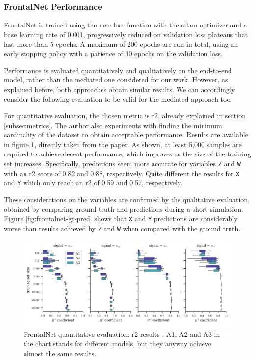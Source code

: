 \subsubsection{FrontalNet Performance}
\label{subsec:frontalnet-performance}


FrontalNet is trained using the \gls{mae} loss function with the \gls{adam} optimizer \cite{kingma2014adam} and a base learning rate of 0.001, progressively reduced on validation loss plateaus that last more than 5 epochs. A maximum of 200 epochs are run in total, using an early stopping policy with a patience of 10 epochs on the validation loss. 

Performance is evaluated quantitatively and qualitatively on the end-to-end model, rather than the mediated one considered for our work. However, as explained before, both approaches obtain similar results. We can accordingly consider the following evaluation to be valid for the mediated approach too.

\medskip 
For quantitative evaluation, the chosen metric is \gls{r2}, already explained in section \ref{subsec:metrics}. The author also experiments with finding the minimum cardinality of the dataset to obtain acceptable performance. Results are available in figure \ref{fig:frontalnet-r2}, directly taken from the paper. As shown, at least 5,000 samples are required to achieve decent performance, which improves as the size of the training set increases. Specifically, predictions seem more accurate for variables \texttt{Z} and \texttt{W} with an \gls{r2} score of 0.82 and 0.88, respectively. Quite different the results for \texttt{X} and \texttt{Y} which only reach an \gls{r2} of 0.59 and 0.57, respectively.

These considerations on the variables are confirmed by the qualitative evaluation, obtained by comparing ground truth and predictions during a short simulation. Figure \ref{fig:frontalnet-gt-pred} shows that \texttt{X} and \texttt{Y} predictions are considerably worse than results achieved by \texttt{Z} and \texttt{W} when compared with the ground truth.

\begin{figure}[!htb]
	\centering
	\includegraphics[width=1\textwidth]{"contents/images/03-frontalnet-r2"}
	\caption[FrontalNet quantitative evaluation: \gls{r2} results \cite{mantegazza2019visionbased}]{FrontalNet quantitative evaluation: \gls{r2} results \cite{mantegazza2019visionbased}. A1, A2 and A3 in the chart stands for different models, but they anyway achieve almost the same results.}
	\label{fig:frontalnet-r2}
\end{figure}

